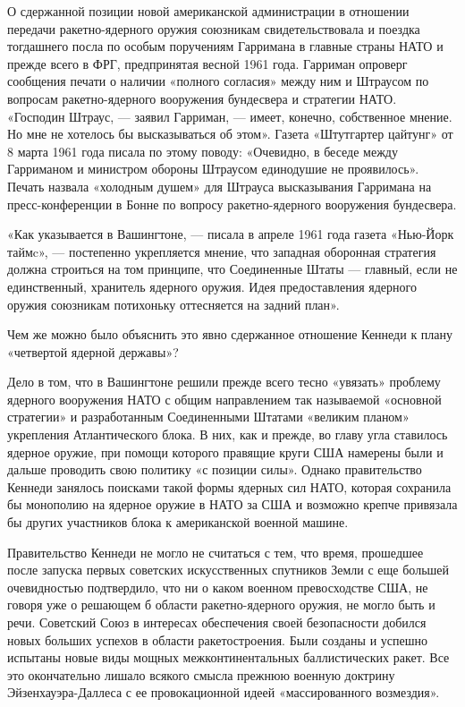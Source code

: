\documentclass[12pt, a4paper, openany]{book}
\begin{document}
О сдержанной позиции новой американской администрации в отношении передачи ракетно-ядерного оружия союзникам свидетельствовала и поездка тогдашнего посла по особым поручениям Гарримана в главные страны НАТО и прежде всего в ФРГ, предпринятая весной 1961 года. Гарриман опроверг сообщения печати о наличии «полного согласия» между ним и Штраусом по вопросам ракетно-ядерного вооружения бундесвера и стратегии НАТО. «Господин Штраус, — заявил Гарриман, — имеет, конечно, собственное мнение. Но мне не хотелось бы высказываться об этом». Газета «Штутгартер цайтунг» от 8 марта 1961 года писала по этому поводу: «Очевидно, в беседе между Гарриманом и министром обороны Штраусом единодушие не проявилось». Печать назвала «холодным душем» для Штрауса высказывания Гарримана на пресс-конференции в Бонне по вопросу ракетно-ядерного вооружения бундесвера.
	
«Как указывается в Вашингтоне, — писала в апреле 1961 года газета «Нью-Йорк таймc», — постепенно укрепляется мнение, что западная оборонная стратегия должна строиться на том принципе, что Соединенные Штаты — главный, если не единственный, хранитель ядерного оружия. Идея предоставления ядерного оружия союзникам потихоньку оттесняется на задний план».
	
Чем же можно было объяснить это явно сдержанное отношение Кеннеди к плану «четвертой ядерной державы»?
	
Дело в том, что в Вашингтоне решили прежде всего тесно «увязать» проблему ядерного вооружения НАТО с общим направлением так называемой «основной стратегии» и разработанным Соединенными Штатами «великим планом» укрепления Атлантического блока. В них, как и прежде, во главу угла ставилось ядерное оружие, при помощи которого правящие круги США намерены были и дальше проводить свою политику «с позиции силы». Однако правительство Кеннеди занялось поисками такой формы ядерных сил НАТО, которая сохранила бы монополию на ядерное оружие в НАТО за США и возможно крепче привязала бы других участников блока к американской военной машине.
	
Правительство Кеннеди не могло не считаться с тем, что время, прошедшее после запуска первых советских искусственных спутников Земли с еще большей очевидностью подтвердило, что ни о каком военном превосходстве США, не говоря уже о решающем б области ракетно-ядерного оружия, не могло быть и речи. Советский Союз в интересах обеспечения своей безопасности добился новых больших успехов в области ракетостроения. Были созданы и успешно испытаны новые виды мощных межконтинентальных баллистических ракет. Все это окончательно лишало всякого смысла прежнюю военную доктрину Эйзенхауэра-Даллеса с ее провокационной идеей «массированного возмездия».
	
\end{document}
